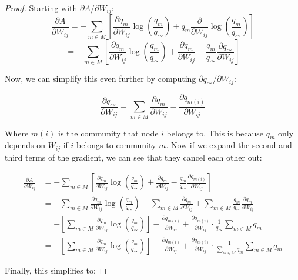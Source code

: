 \documentclass[pdflatex,sn-mathphys-num]{sn-jnl}%
\theoremstyle{thmstyleone}%
\theoremstyle{thmstyletwo}%
\theoremstyle{thmstylethree}%
\begin{document}
\begin{appendices}
\begin{proof}
Starting with $\partial A / \partial W_{ij}$:
$$\frac{\partial A}{\partial W_{ij}} = -\sum_{m \in M} \left[ \frac{\partial q_m}{\partial W_{ij}} \log \left( \frac{q_m}{q_{\curvearrowright}} \right) + q_m \frac{\partial}{\partial W_{ij}} \log \left( \frac{q_m}{q_{\curvearrowright}} \right) \right]$$
$$ = -\sum_{m \in M} \left[ \frac{\partial q_m}{\partial W_{ij}} \log \left( \frac{q_m}{q_{\curvearrowright}} \right) + \frac{\partial q_m}{\partial W_{ij}} - \frac{q_m}{q_{\curvearrowright}} \frac{\partial q_{\curvearrowright}}{\partial W_{ij}} \right]$$

Now, we can simplify this even further by computing $\partial q_{\curvearrowright} / \partial W_{ij}$:

$$\frac{\partial q_{\curvearrowright}}{\partial W_{ij}} = \sum_{m \in M} \frac{\partial q_m}{\partial W_{ij}}=\frac{\partial q_{m(i)}}{\partial W_{ij}}$$

Where $m(i)$ is the community that node $i$ belongs to. This is because $q_m$ only depends on $W_{ij}$ if $i$ belongs to community $m$. Now if we expand the second and third terms of the gradient, we can see that they cancel each other out:

\begin{align*}
\frac{\partial A}{\partial W_{ij}} &= -\sum_{m \in M} \left[ \frac{\partial q_m}{\partial W_{ij}} \log \left( \frac{q_m}{q_{\curvearrowright}} \right) + \frac{\partial q_m}{\partial W_{ij}} - \frac{q_m}{q_{\curvearrowright}} \frac{\partial q_{m(i)}}{\partial W_{ij}} \right] \\
&= - \sum_{m \in M} \frac{\partial q_m}{\partial W_{ij}} \log \left( \frac{q_m}{q_{\curvearrowright}} \right) -\sum_{m \in M} \frac{\partial q_m}{\partial W_{ij}} + \sum_{m \in M} \frac{q_m}{q_{\curvearrowright}} \frac{\partial q_m}{\partial W_{ij}} \\
&= - \left[\sum_{m \in M} \frac{\partial q_m}{\partial W_{ij}} \log \left( \frac{q_m}{q_{\curvearrowright}} \right)\right] - \frac{\partial q_{m(i)}}{\partial W_{ij}} + \frac{\partial q_{m(i)}}{\partial W_{ij}}\cdot\frac{1}{q_{\curvearrowright}}\sum_{m \in M} q_m \\
&= - \left[\sum_{m \in M} \frac{\partial q_m}{\partial W_{ij}} \log \left( \frac{q_m}{q_{\curvearrowright}} \right)\right] - \frac{\partial q_{m(i)}}{\partial W_{ij}} + \frac{\partial q_{m(i)}}{\partial W_{ij}}\cdot\frac{1}{\sum_{m \in M} q_m}\sum_{m \in M} q_m
\end{align*}

Finally, this simplifies to:


\end{proof}
\end{appendices}
\end{document}
